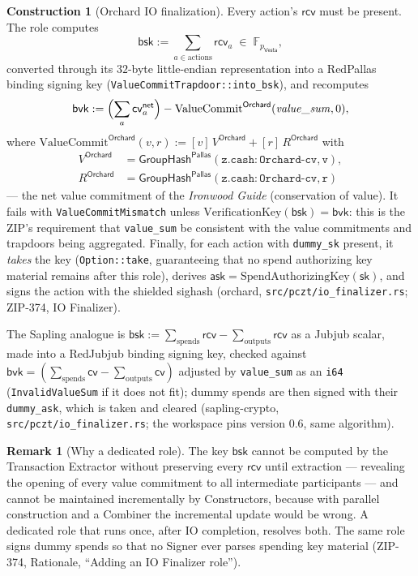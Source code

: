 \documentclass[11pt,a4paper]{article}
\theoremstyle{definition}
\newtheorem{construction}[theorem]{Construction}
\newtheorem{remark}[theorem]{Remark}
\newcommand{\F}{\mathbb{F}}
\newcommand{\cvsym}{\mathsf{cv}}
\newcommand{\Pallas}{\ensuremath{\mathsf{Pallas}}}
\newcommand{\Vesta}{\ensuremath{\mathsf{Vesta}}}
\newcommand{\GroupHash}{\ensuremath{\mathsf{GroupHash}}}
\newcommand{\ask}{\ensuremath{\mathsf{ask}}}
\newcommand{\rcv}{\ensuremath{\mathsf{rcv}}}
\begin{document}
\begin{construction}[Orchard IO finalization]\label{def:pczt-bsk}
Every action's $\rcv$ must be present. The role computes
\[
\mathsf{bsk} := \sum_{a \in \text{actions}} \rcv_a
\;\in\; \F_{p_{\Vesta}},
\]
converted through its $32$-byte little-endian representation into a
RedPallas binding signing key
(\texttt{ValueCommitTrapdoor::into\_bsk}), and recomputes
\[
\mathsf{bvk} := \Bigl(\sum_{a} \cvsym^{\mathsf{net}}_a\Bigr)
- \mathrm{ValueCommit}^{\mathsf{Orchard}}(\mathit{value\_sum}, 0),
\]
where $\mathrm{ValueCommit}^{\mathsf{Orchard}}(v, r) :=
[v]\,V^{\mathsf{Orchard}} + [r]\,R^{\mathsf{Orchard}}$ with
\begin{align*}
V^{\mathsf{Orchard}} &=
\GroupHash^{\Pallas}(\mathtt{z.cash:Orchard\text{-}cv}, \mathtt{v}), \\
R^{\mathsf{Orchard}} &=
\GroupHash^{\Pallas}(\mathtt{z.cash:Orchard\text{-}cv}, \mathtt{r})
\end{align*}
--- the net value commitment of the \emph{Ironwood Guide} (conservation
of value). It fails with \texttt{ValueCommitMismatch} unless
$\mathrm{VerificationKey}(\mathsf{bsk}) = \mathsf{bvk}$: this is the
ZIP's requirement that \texttt{value\_sum} be consistent with the value
commitments and trapdoors being aggregated. Finally, for each action with
\texttt{dummy\_sk} present, it \emph{takes} the key
(\texttt{Option::take}, guaranteeing that no spend authorizing key
material remains after this role), derives
$\ask = \mathrm{SpendAuthorizingKey}(\mathsf{sk})$, and signs the action
with the shielded sighash (\textsf{orchard},
\texttt{src/pczt/io\_finalizer.rs}; ZIP-374, IO Finalizer).

The Sapling analogue is
$\mathsf{bsk} := \sum_{\text{spends}} \rcv - \sum_{\text{outputs}} \rcv$
as a Jubjub scalar, made into a RedJubjub binding signing key, checked
against $\mathsf{bvk} = (\sum_{\text{spends}} \cvsym -
\sum_{\text{outputs}} \cvsym)$ adjusted by \texttt{value\_sum} as an
\texttt{i64} (\texttt{InvalidValueSum} if it does not fit); dummy spends
are then signed with their \texttt{dummy\_ask}, which is taken and
cleared (\textsf{sapling-crypto}, \texttt{src/pczt/io\_finalizer.rs};
the workspace pins version 0.6, same algorithm).
\end{construction}

\begin{remark}[Why a dedicated role]\label{rem:pczt-iofin-rationale}
The key $\mathsf{bsk}$ cannot be computed by the Transaction Extractor
without preserving every $\rcv$ until extraction --- revealing the
opening of every value commitment to all intermediate participants ---
and cannot be maintained incrementally by Constructors, because with
parallel construction and a Combiner the incremental update would be
wrong. A dedicated role that runs once, after IO completion, resolves
both. The same role signs dummy spends so that no Signer ever parses
spending key material (ZIP-374, Rationale, ``Adding an IO Finalizer
role'').
\end{remark}
\end{document}
